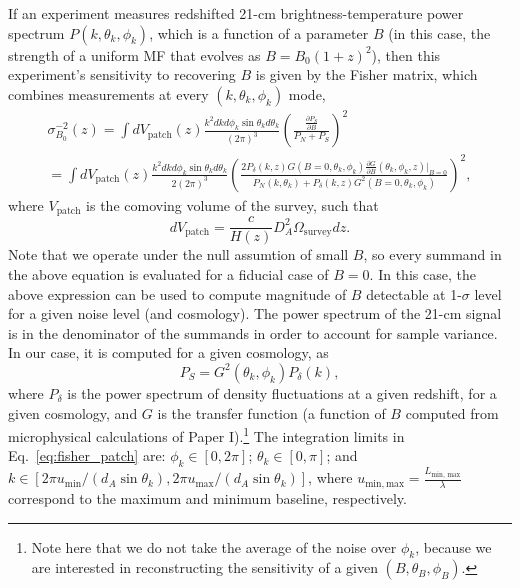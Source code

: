 \documentclass[12pt]{paper}
\newcommand{\beq}{\begin{equation}}
\newcommand{\eeq}{\end{equation}}
\begin{document}
If an experiment measures redshifted 21-cm brightness-temperature power spectrum $P(k,\theta_k,\phi_k)$, which is a function of a parameter $B$ (in this case, the strength of a uniform MF that evolves as $B=B_0(1+z)^2$), then this experiment's sensitivity to recovering $B$ is given by the Fisher matrix, which combines measurements at every $(k,\theta_k,\phi_k)$ mode,
\begin{equation}
\begin{gathered}
\sigma_{B_0}^{-2}(z) = \int dV_\mathrm{patch}(z)
\frac{k^2dk d\phi_k\sin \theta_kd\theta_k}{(2\pi)^3}\left(  \frac{\frac{\partial P_S}{\partial B}}{P_N + P_S }\right)^2 \\
=\int dV_\mathrm{patch}(z)
\frac{k^2dk d\phi_k\sin \theta_kd\theta_k}{2(2\pi)^3}\left( \frac{2P_\delta(k,z)G(B=0,\theta_k,\phi_k)\frac{\partial G}{\partial B}(\theta_k, \phi_k,z)\bigg|_{B=0}}{P_N(k,\theta_k) + P_\delta(k,z)G^2(B=0,\theta_k,\phi_k)} \right)^2,
\end{gathered}
\label{eq:fisher_patch}
\end{equation}
where $V_\mathrm{patch}$ is the comoving volume of the survey, such that
\beq
dV_\mathrm{patch} = \frac{c}{H(z)}D_A^2\Omega_\mathrm{survey}dz.
\label{eq:dVpatch}
\eeq
Note that we operate under the null assumtion of small $B$, so every summand in the above equation is evaluated for a fiducial case of $B=0$. In this case, the above expression can be used to compute magnitude of $B$ detectable at 1-$\sigma$ level for a given noise level (and cosmology). The power spectrum of the 21-cm signal is in the denominator of the summands in order to account for sample variance. In our case, it is computed for a given cosmology, as
\begin{equation}
P_S = G^2(\theta_k, \phi_k) P_\delta (k),
\label{eq:PS}
\end{equation}
where $P_\delta$ is the power spectrum of density fluctuations at a given redshift, for a given cosmology, and $G$ is the transfer function (a function of $B$ computed from microphysical calculations of Paper I).\footnote{Note here that we do not take the average of the noise over $\phi_k$, because we are interested in reconstructing the sensitivity of a given $(B,\theta_B,\phi_B)$. }
The integration limits in Eq.~\ref{eq:fisher_patch} are: $\phi_k\in[0,2\pi]$; $\theta_k\in [0,\pi]$; and $k\in[2\pi u_\mathrm{min}/(d_A\sin\theta_k),2\pi u_\mathrm{max}/(d_A\sin\theta_k)]$, where $u_\mathrm{min, max}=\frac{L_\text{min, max}}{\lambda}$ correspond to the maximum and minimum baseline, respectively.
\end{document}
